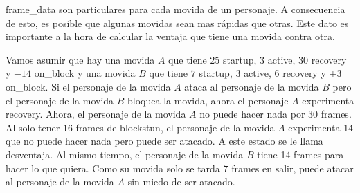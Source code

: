 \gls{frame_data} son particulares para cada movida de un personaje. A consecuencia de esto, es posible que algunas movidas sean mas rápidas que otras. Este dato es importante a la hora de calcular la ventaja que tiene una movida contra otra. 

Vamos asumir que hay una movida $A$ que tiene $25$ \gls{startup}, $3$ \gls{active}, $30$ \gls{recovery} y $-14$ \gls{on_block} y una movida $B$ que tiene $7$ \gls{startup}, $3$ \gls{active}, $6$ \gls{recovery} y $+3$ \gls{on_block}. Si el personaje de la movida $A$ ataca al personaje de la movida $B$ pero el personaje de la movida $B$ bloquea la movida, ahora el personaje $A$ experimenta \gls{recovery}. Ahora, el personaje de la movida $A$ no puede hacer nada por $30$ frames. Al solo tener $16$ frames de \gls{blockstun}, el personaje de la movida $A$ experimenta $14$ que no puede hacer nada pero puede ser atacado. A este estado se le llama desventaja. Al mismo tiempo, el personaje de la movida $B$ tiene 14 frames para hacer lo que quiera. Como su movida solo se tarda $7$ frames en salir, puede atacar al personaje de la movida $A$ sin miedo de ser atacado.